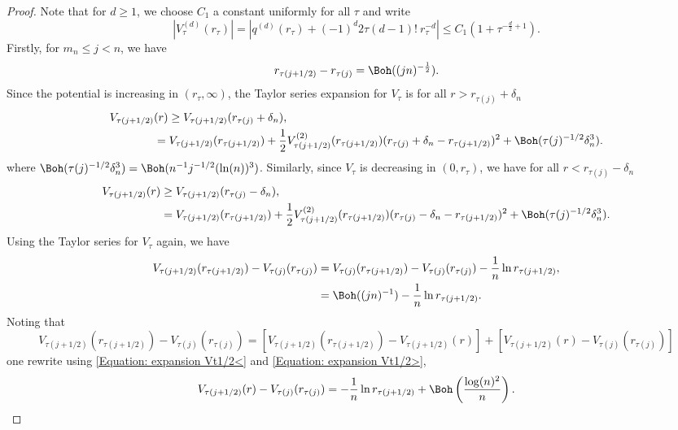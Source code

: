 \begin{proof}
Note that for $d \geq 1$, we choose $C_1$ a constant uniformly for all $\tau$ and write
\begin{equation}
	|V^{(d)}_\tau(r_\tau)| = |q^{(d)}(r_\tau) + (-1)^{d} 2 \tau (d-1)! \ r_\tau^{-d} | \leq C_1 (1 + \tau^{-\frac{d}{2} + 1}).
\end{equation}
Firstly, for $m_n \leq j < n$, we have
\begin{equation}
	r_{\tau(j + 1/2)} - r_{\tau(j)} = \Boh((jn)^{-\frac{1}{2}}).
\end{equation}
Since the potential is increasing in $(r_\tau, \infty)$, the Taylor series expansion for $V_\tau$ is for all $r > r_{\tau(j)} + \delta_n$
\begin{align}	\label{Equation: expansion Vt1/2>}	
	V_{\tau(j +1/2)}& (r) \geq V_{\tau(j +1/2)}(r_{\tau(j)} + \delta_n), \\
	& = V_{\tau(j + 1/2)}(r_{\tau(j +1/2)}) + \frac{1}{2} V^{(2)}_{\tau(j + 1/2)}(r_{\tau(j + 1/2)}) (r_{\tau(j)} + \delta_n - r_{\tau(j + 1/2)})^2 + \Boh(\tau(j)^{-1/2} \delta^3_n).
\end{align}
where $\Boh(\tau(j)^{-1/2} \delta^3_n) = \Boh(n^{-1} j^{-1/2}(\ln(n))^3)$. Similarly, since $V_{\tau}$ is decreasing in $(0, r_\tau)$, we have for all $r < r_{\tau(j)} - \delta_n$
\begin{align}
	V_{\tau(j + 1/2)}(r) & \geq V_{\tau(j +1/2)}(r_{\tau(j)} - \delta_n), \\
	& = V_{\tau(j + 1/2)}(r_{\tau(j + 1/2)}) + \frac{1}{2} V^{(2)}_{\tau(j + 1/2)}(r_{\tau(j + 1/2)}) (r_{\tau(j)} - \delta_n - r_{\tau(j + 1/2)})^2 + \Boh(\tau(j)^{-1/2} \delta^3_n).
	\label{Equation: expansion Vt1/2<}
\end{align}
Using the Taylor series for $V_\tau$ again, we have
\begin{align}
	V_{\tau(j+1/2)}(r_{\tau(j+1/2)}) - V_{\tau(j)}(r_{\tau(j)}) & = V_{\tau(j)}(r_{\tau(j+1/2)}) - V_{\tau(j)}(r_{\tau(j)}) - \frac{1}{n} \ln r_{\tau(j+1/2)}, \\
	& = \Boh((jn)^{-1})  - \frac{1}{n} \ln r_{\tau(j+1/2)}.
\end{align}
Noting that
\begin{equation}
	V_{\tau(j+1/2)}(r_{\tau(j+1/2)}) - V_{\tau(j)}(r_{\tau(j)})
	= [V_{\tau(j+1/2)}(r_{\tau(j+1/2)}) - V_{\tau(j+1/2)}(r)] + [V_{\tau(j+1/2)}(r) - V_{\tau(j)}(r_{\tau(j)})]
\end{equation}
one rewrite using \eqref{Equation: expansion Vt1/2<} and \eqref{Equation: expansion Vt1/2>},
\begin{equation}
	V_{\tau(j+1/2)}(r) - V_{\tau(j)}(r_{\tau(j)}) = - \frac{1}{n} \ln r_{\tau(j+1/2)} + \Boh\left(\frac{\log(n)^2}{n}\right).
\end{equation}


\end{proof}
